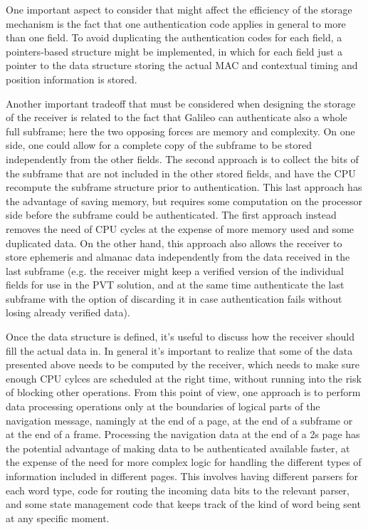One important aspect to consider that might affect the efficiency of the storage
mechanism is the fact that one authentication code applies in general to more
than one field. To avoid duplicating the authentication codes for each field, a
pointers-based structure might be implemented, in which for each field just a
pointer to the data structure storing the actual MAC and contextual timing and
position information is stored.

Another important tradeoff that must be considered when designing the storage of
the receiver is related to the fact that Galileo can authenticate also a whole
full subframe; here the two opposing forces are memory and complexity. On one
side, one could allow for a complete copy of the subframe to be stored
independently from the other fields. The second approach is to collect the bits
of the subframe that are not included in the other stored fields, and have the
CPU recompute the subframe structure prior to authentication. This last approach
has the advantage of saving memory, but requires some computation on the
processor side before the subframe could be authenticated. The first approach
instead removes the need of CPU cycles at the expense of more memory used and
some duplicated data. On the other hand, this approach also allows the receiver
to store ephemeris and almanac data independently from the data received in the
last subframe (e.g. the receiver might keep a verified version of the individual
fields for use in the PVT solution, and at the same time authenticate the last
subframe with the option of discarding it in case authentication fails without
losing already verified data).

\vspace{\baselineskip}

Once the data structure is defined, it's useful to discuss how the receiver
should fill the actual data in. In general it's important to realize that some
of the data presented above needs to be computed by the receiver, which needs to
make sure enough CPU cylces are scheduled at the right time, without running
into the risk of blocking other operations. From this point of view, one
approach is to perform data processing operations only at the boundaries of
logical parts of the navigation message, namingly at the end of a page, at the
end of a subframe or at the end of a frame. Processing the navigation data at
the end of a \num{2}\si{s} page has the potential advantage of making
data to be authenticated available faster, at the expense of the need for more
complex logic for handling the different types of information included in
different pages. This involves having different parsers for each word type, code
for routing the incoming data bits to the relevant parser, and some state
management code that keeps track of the kind of word being sent at any specific
moment.


